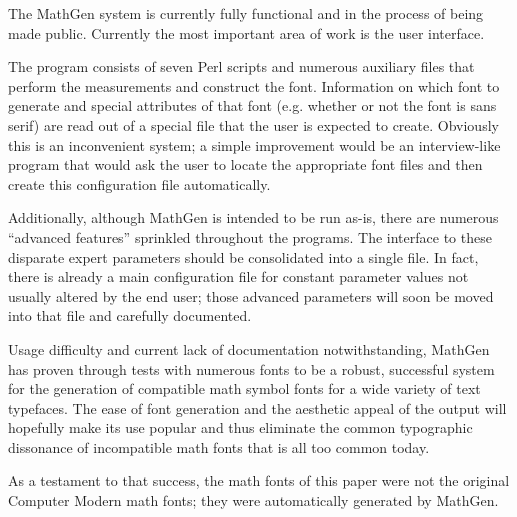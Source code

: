 
The MathGen system is currently fully functional and in the process of being
made public. Currently the most important area of work is the user interface.

The program consists of seven Perl scripts and numerous auxiliary files that
perform the measurements and construct the font. Information on which font to
generate and special attributes of that font (e.g. whether or not the font is
sans serif) are read out of a special file that the user is expected to create.
Obviously this is an inconvenient system; a simple improvement would be an
interview-like program that would ask the user to locate the appropriate font
files and then create this configuration file automatically.

Additionally, although MathGen is intended to be run as-is, there are numerous
``advanced features'' sprinkled throughout the programs. The interface to these
disparate expert parameters should be consolidated into a single file. In fact,
there is already a main configuration file for constant parameter values not
usually altered by the end user; those advanced parameters will soon be moved
into that file and carefully documented.

Usage difficulty and current lack of documentation notwithstanding, MathGen has
proven through tests with numerous fonts to be a robust, successful system for
the generation of compatible math symbol fonts for a wide variety of text
typefaces. The ease of font generation and the aesthetic appeal of the output
will hopefully make its use popular and thus eliminate the common typographic
dissonance of incompatible math fonts that is all too common today.

As a testament to that success, the math fonts of this paper were not the
original Computer Modern math fonts; they were automatically generated by
MathGen.
